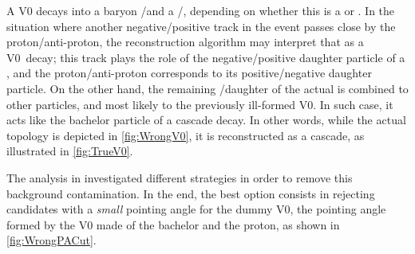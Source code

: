 A V0 decays into a baryon \proton/\pbar and a \rmPiMinus/\rmPiPlus, depending on whether this is a \rmLambda or \rmAlambda. In the situation where another negative/positive track in the event passes close by the proton/anti-proton, the reconstruction algorithm may interpret that as a V0~decay; this track plays the role of the negative/positive daughter particle of a \rmLambdaPM, and the proton/anti-proton corresponds to its positive/negative daughter particle. On the other hand, the remaining \rmPiMinus/\rmPiPlus daughter of the actual \rmLambdaPM is combined to other particles, and most likely to the previously ill-formed V0. In such case, it acts like the bachelor particle of a cascade decay. In other words, while the actual topology is depicted in \fig\ref{fig:WrongV0}, it is reconstructed as a cascade, as illustrated in \fig\ref{fig:TrueV0}.

The analysis in \cite{silvadealbuquerqueMultistrangeHadronsPb2019} investigated different strategies in order to remove this background contamination. In the end, the best option consists in rejecting candidates with a \emph{small} pointing angle for the dummy V0, \ie the pointing angle formed by the V0 made of the bachelor and the proton, as shown in \fig\ref{fig:WrongPACut}.


